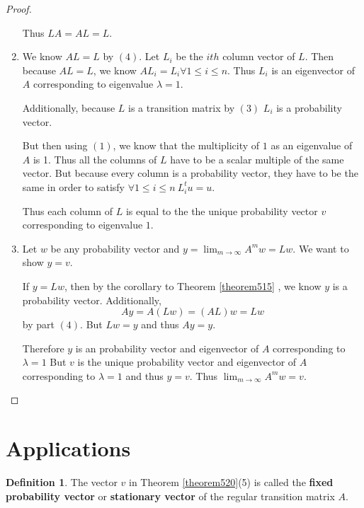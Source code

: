 \documentclass{amsart}
\theoremstyle{definition}
\newtheorem{definition}[thm]{Definition}
\theoremstyle{remark}
\numberwithin{equation}{section}
\begin{document}
\begin{proof}
\begin{enumerate}
			Thus $LA = AL = L$.


	\item 

			We know $AL = L$ by $(4)$.
			Let $L_i$ be the $ith$ column vector of $L$.
			Then because $AL = L$, we know $AL_i = L_i \forall 1 \leq i \leq n$.
			Thus $L_i$ is an eigenvector of $A$ corresponding to eigenvalue $\lambda = 1$.

			Additionally, because $L$ is a transition matrix by $(3)$ $L_i$ is a probability vector.

			But then using $(1)$, we know that the multiplicity of $1$ as an eigenvalue of $A$ is 1.
			Thus all the columns of $L$ have to be a scalar multiple of the same vector.
			But because every column is a probability vector, they have to be the same in order to satisfy $\forall 1 \leq i \leq n\ L_i^t u = u$. 

			Thus each column of $L$ is equal to the the unique probability vector $v$ corresponding to eigenvalue $1$.

	\item 
		Let $w$ be any probability vector and $y = \lim_{m \to \infty} A^m w  = Lw$.
		We want to show $y = v$.
		
		If $y = Lw$, then by the corollary to Theorem \ref{theorem515} , we know $y$ is a probability vector.
		Additionally,
		$$Ay = A(Lw) = (AL)w = Lw$$
		by part $(4)$.
		But $Lw = y$ and thus $Ay = y$.

		Therefore $y$ is an probability vector and eigenvector of $A$ corresponding to $\lambda = 1$
		But $v$ is the unique probability vector and eigenvector of $A$ corresponding to $\lambda = 1$ and thus $y = v$.
		Thus $\lim_{m \to \infty} A^m w = v$.


\end{enumerate}


\end{proof}

\section{Applications}

\begin{definition}
The vector $v$ in Theorem \ref{theorem520}(5) is called the \textbf{fixed probability vector} or \textbf{stationary vector} of the regular transition matrix $A$.

\end{definition}
\end{document}
